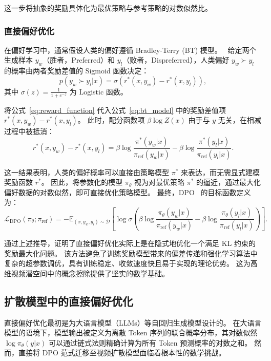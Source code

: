 这一步将抽象的奖励具体化为最优策略与参考策略的对数似然比。~\cite{schulman2017proximal}

\subsubsection{直接偏好优化}

在偏好学习中，通常假设人类的偏好遵循 Bradley-Terry (BT) 模型。~\cite{sutton1998reinforcement}
给定两个生成样本 $y_w$（胜者，Preferred）和 $y_l$（败者，Dispreferred），人类偏好 $y_w \succ y_l$ 的概率由两者奖励差值的 Sigmoid 函数决定：
\begin{equation}\label{eq:bt_model}
p(y_w \succ y_l | x) = \sigma(r^*(x, y_w) - r^*(x, y_l)),
\end{equation}
其中 $\sigma(z) = \frac{1}{1 + e^{-z}}$ 为 Logistic 函数。

将公式~\ref{eq:reward_function} 代入公式~\ref{eq:bt_model} 中的奖励差值项 $r^*(x, y_w) - r^*(x, y_l)$。
此时，配分函数项 $\beta \log Z(x)$ 由于与 $y$ 无关，在相减过程中被抵消：
\begin{equation}\label{eq:reward_difference}
r^*(x, y_w) - r^*(x, y_l) = \beta \log \frac{\pi^*(y_w|x)}{\pi_{\text{ref}}(y_w|x)} - \beta \log \frac{\pi^*(y_l|x)}{\pi_{\text{ref}}(y_l|x)}.
\end{equation}

这一结果表明，人类的偏好概率可以直接由策略模型 $\pi^*$ 来表达，而无需显式建模奖励函数 $r^*$。
因此，将参数化的模型 $\pi_\theta$ 视为对最优策略 $\pi^*$ 的逼近，通过最大化偏好数据的对数似然，即可直接优化策略模型。
最终，DPO~\cite{rafailov2023direct} 的目标函数定义为：
\begin{equation}\label{eq:dpo_objective}
\mathcal{L}_{\text{DPO}}(\pi_\theta; \pi_{\text{ref}}) = -\mathbb{E}_{(x, y_w, y_l) \sim \mathcal{D}} \left[ \log \sigma \left( \beta \log \frac{\pi_\theta(y_w|x)}{\pi_{\text{ref}}(y_w|x)} - \beta \log \frac{\pi_\theta(y_l|x)}{\pi_{\text{ref}}(y_l|x)} \right) \right].
\end{equation}

通过上述推导，证明了直接偏好优化实际上是在隐式地优化一个满足 KL 约束的奖励最大化问题。
该方法避免了训练奖励模型带来的偏差传递和强化学习算法中复杂的超参数调优，具有训练稳定、收敛速度快且易于实现的理论优势。
这为高维视频潜空间中的概念擦除提供了坚实的数学基础。

\subsection{扩散模型中的直接偏好优化}\label{subsec:dpo_diffusion}
直接偏好优化最初是为大语言模型（LLMs）等自回归生成模型设计的。
在大语言模型的语境下，模型输出被定义为离散 Token 序列的联合概率分布，其对数似然 $\log \pi_\theta(y|x)$ 可以通过链式法则精确计算为所有 Token 预测概率的对数之和。
然而，直接将 DPO 范式迁移至视频扩散模型面临着根本性的数学挑战。

